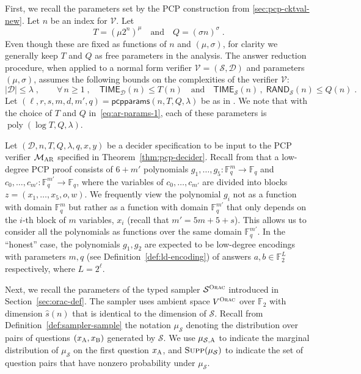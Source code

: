 \documentclass[11pt]{article}
\theoremstyle{definition}
\newcommand{\F}{\ensuremath{\mathbb{F}}}
\DeclareMathOperator{\poly}{poly}
\newcommand{\supp}{\textsc{Supp}}
\newcommand{\sampler}{\mathcal{S}}
\newcommand{\decider}{\mathcal{D}}
\newcommand{\verifier}{\mathcal{V}}
\newcommand{\gamestyle}[1]{\ensuremath{\textsc{#1}}\xspace}
\newcommand{\ora}{\gamestyle{Orac}}
\newcommand{\ar}{\gamestyle{AR}}
\newcommand{\labelstyle}[1]{\ensuremath{\textsc{#1}}\xspace}
\newcommand{\alice}{\labelstyle{A}}
\newcommand{\bob}{\labelstyle{B}}
\newcommand{\pcpparams}{\mathsf{pcpparams}}
\newcommand{\TIME}{\mathsf{TIME}}
\newcommand{\RAND}{\mathsf{RAND}}
\newcommand{\pcpverifier}{\mathcal{M}_\ar}
\newcommand{\qlen}{Q}
\begin{document}
First, we recall the parameters set by the PCP construction from
\cref{sec:pcp-cktval-new}. Let $n$ be an index for $\verifier$. Let
\begin{equation}
  \label{eq:ar-params-1}
  T=(\mu 2^n)^\mu\quad\text{and}\quad \qlen = (\sigma n)^{\sigma}\;.
\end{equation} 
Even though these are fixed as functions of $n$ and $(\mu,\sigma)$, for clarity
we generally keep $T$ and $\qlen$ as free parameters in the analysis.
The answer reduction procedure, when applied to a normal form verifier
$\verifier=(\sampler,\decider)$ and parameters $(\mu,\sigma)$, assumes the
following bounds on the complexities of the verifier $\verifier$:
\begin{equation}
  \label{eq:ar-time-assumption}
  |\decider|\leq\lambda\;,\qquad  \forall\, n\geq 1\;,
  \quad\TIME_\decider(n) \leq T(n)\quad
  \text{and}\quad \TIME_\sampler(n)\,,\;\RAND_\sampler(n)\leq Q(n)\;.
\end{equation}
Let $(\ell, r, s, m ,d, m',q) = \pcpparams(n, T, \qlen,\lambda)$ be as in
.
We note that with the choice of $T$ and $\qlen$ in~\eqref{eq:ar-params-1}, each
of these parameters is $\poly(\log T,Q,\lambda)$.

Let $(\decider,n,T,\qlen,\lambda, q,x,y)$ be a decider specification to be input
to the PCP verifier $\pcpverifier$ specified in Theorem~\ref{thm:pcp-decider}.
Recall from  that a low-degree PCP proof consists of $6 +
m'$ polynomials $g_1, \dots, g_5: \F_q^{m} \to \F_q$ and $c_0, \dots, c_{m'}:
\F_q^{m'} \to \F_q$, where the variables of $c_0, \dots, c_{m'}$ are divided
into blocks $z = (x_1, \dots, x_5, o, w)$.
We frequently view the polynomial $g_i$ not as a function with domain $\F_q^{m}$
but rather as a function with domain $\F_q^{m'}$ that only depends on the $i$-th
block of $m$ variables, $x_i$ (recall that $m'=5m+5+s$).
This allows us to consider all the polynomials as functions over the same domain
$\F_{q}^{m'}$.
In the ``honest'' case, the polynomials $g_1, g_2$ are expected to be low-degree
encodings with parameters $m,q$ (see Definition~\ref{def:ld-encoding}) of
answers $a, b \in \F_2^L$ respectively, where $L=2^\ell$.

Next, we recall the parameters of the typed sampler $\sampler^\ora$ introduced in
Section~\ref{sec:orac-def}.
The sampler uses ambient space $V^\ora$ over $\F_2$ with dimension $\hat{s}(n)$
that is identical to the dimension of $\sampler$.
Recall from Definition~\ref{def:sampler-sample} the notation $\mu_{\sampler}$
denoting the distribution over pairs of questions $(x_\alice,x_\bob)$ generated by
$\sampler$.
We use $\mu_{\sampler, \alice}$ to indicate the marginal distribution of
$\mu_\sampler$ on the first question $x_\alice$, and $\supp(\mu_{\sampler})$ to
indicate the set of question pairs that have nonzero probability under
$\mu_\sampler$.
\end{document}
